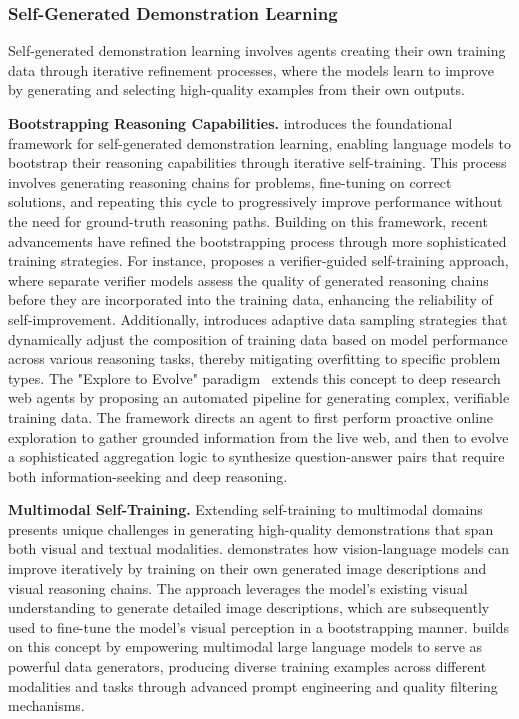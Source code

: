 \documentclass[10pt]{article} %
\begin{document}
\subsubsection{Self-Generated Demonstration Learning}

Self-generated demonstration learning involves agents creating their own training data through iterative refinement processes, where the models learn to improve by generating and selecting high-quality examples from their own outputs.

\textbf{Bootstrapping Reasoning Capabilities.} 
\cite{zelikman2022star} introduces the foundational framework for self-generated demonstration learning, enabling language models to bootstrap their reasoning capabilities through iterative self-training. This process involves generating reasoning chains for problems, fine-tuning on correct solutions, and repeating this cycle to progressively improve performance without the need for ground-truth reasoning paths. Building on this framework, recent advancements have refined the bootstrapping process through more sophisticated training strategies. For instance, \cite{hosseini2024v} proposes a verifier-guided self-training approach, where separate verifier models assess the quality of generated reasoning chains before they are incorporated into the training data, enhancing the reliability of self-improvement. Additionally, \cite{koh2025adastar} introduces adaptive data sampling strategies that dynamically adjust the composition of training data based on model performance across various reasoning tasks, thereby mitigating overfitting to specific problem types. The "Explore to Evolve" paradigm~\citep{wang2025exploretoevolve} extends this concept to deep research web agents by proposing an automated pipeline for generating complex, verifiable training data. The framework directs an agent to first perform proactive online exploration to gather grounded information from the live web, and then to evolve a sophisticated aggregation logic to synthesize question-answer pairs that require both information-seeking and deep reasoning.

\textbf{Multimodal Self-Training.} 
Extending self-training to multimodal domains presents unique challenges in generating high-quality demonstrations that span both visual and textual modalities. \cite{deng2024enhancing} demonstrates how vision-language models can improve iteratively by training on their own generated image descriptions and visual reasoning chains. The approach leverages the model’s existing visual understanding to generate detailed image descriptions, which are subsequently used to fine-tune the model’s visual perception in a bootstrapping manner. \cite{zhao2024genixer} builds on this concept by empowering multimodal large language models to serve as powerful data generators, producing diverse training examples across different modalities and tasks through advanced prompt engineering and quality filtering mechanisms.
\end{document}
